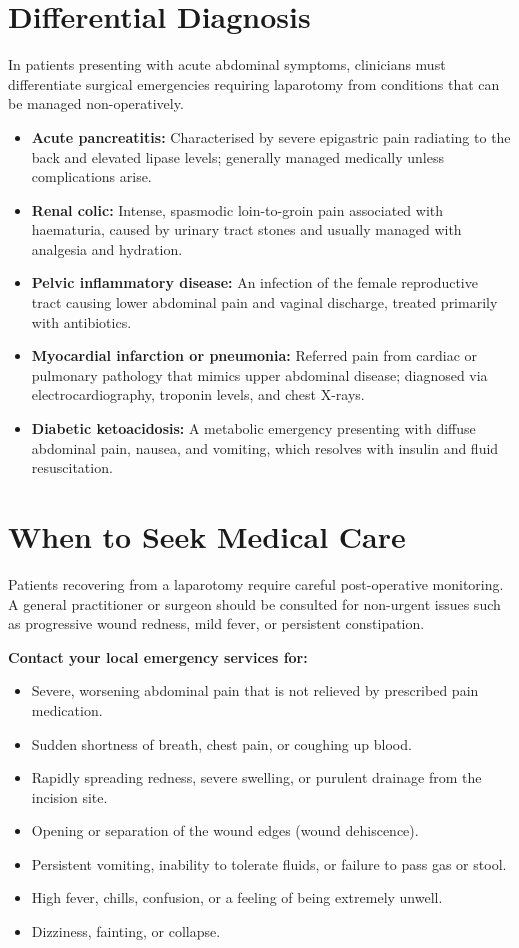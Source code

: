 \section*{Differential Diagnosis}
In patients presenting with acute abdominal symptoms, clinicians must differentiate surgical emergencies requiring laparotomy from conditions that can be managed non-operatively.

\begin{itemize}
    \item \textbf{Acute pancreatitis:} Characterised by severe epigastric pain radiating to the back and elevated lipase levels; generally managed medically unless complications arise.
    \item \textbf{Renal colic:} Intense, spasmodic loin-to-groin pain associated with haematuria, caused by urinary tract stones and usually managed with analgesia and hydration.
    \item \textbf{Pelvic inflammatory disease:} An infection of the female reproductive tract causing lower abdominal pain and vaginal discharge, treated primarily with antibiotics.
    \item \textbf{Myocardial infarction or pneumonia:} Referred pain from cardiac or pulmonary pathology that mimics upper abdominal disease; diagnosed via electrocardiography, troponin levels, and chest X-rays.
    \item \textbf{Diabetic ketoacidosis:} A metabolic emergency presenting with diffuse abdominal pain, nausea, and vomiting, which resolves with insulin and fluid resuscitation.
\end{itemize}

\section*{When to Seek Medical Care}
Patients recovering from a laparotomy require careful post-operative monitoring. A general practitioner or surgeon should be consulted for non-urgent issues such as progressive wound redness, mild fever, or persistent constipation.

\textbf{Contact your local emergency services for:}
\begin{itemize}
    \item Severe, worsening abdominal pain that is not relieved by prescribed pain medication.
    \item Sudden shortness of breath, chest pain, or coughing up blood.
    \item Rapidly spreading redness, severe swelling, or purulent drainage from the incision site.
    \item Opening or separation of the wound edges (wound dehiscence).
    \item Persistent vomiting, inability to tolerate fluids, or failure to pass gas or stool.
    \item High fever, chills, confusion, or a feeling of being extremely unwell.
    \item Dizziness, fainting, or collapse.
\end{itemize}

